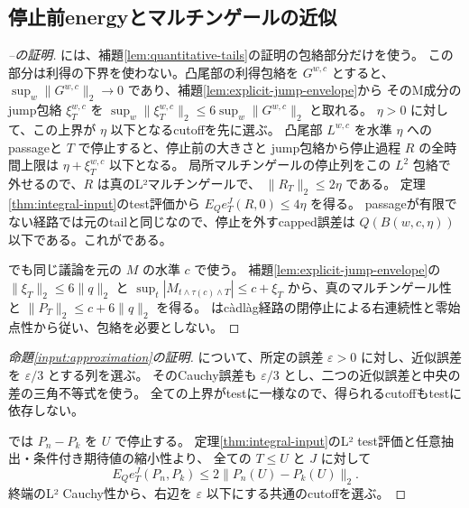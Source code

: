 \subsection{停止前energyとマルチンゲールの近似}
\label{sec:approximation-inputs}
\begin{proof}[--の証明]
には、補題\ref{lem:quantitative-tails}の証明の包絡部分だけを使う。
この部分は利得の下界を使わない。凸尾部の利得包絡を $G^{w,c}$ とすると、
$\sup_w\|G^{w,c}\|_2\to0$ であり、補題\ref{lem:explicit-jump-envelope}から
そのM成分のjump包絡 $\xi_T^{w,c}$ を $\sup_w\|\xi_T^{w,c}\|_2\leq6\sup_w\|G^{w,c}\|_2$ と取れる。
$\eta>0$ に対して、この上界が $\eta$ 以下となるcutoffを先に選ぶ。
凸尾部 $L^{w,c}$ を水準 $\eta$ へのpassageと $T$ で停止すると、停止前の大きさと
jump包絡から停止過程 $R$ の全時間上限は $\eta+\xi_T^{w,c}$ 以下となる。
局所マルチンゲールの停止列をこの $L^2$ 包絡で外せるので、$R$ は真のL²マルチンゲールで、
$\|R_T\|_2\leq2\eta$ である。
定理\ref{thm:integral-input}のtest評価から $E_Q e_T^J(R,0)\leq4\eta$ を得る。
passageが有限でない経路では元のtailと同じなので、停止を外すcapped誤差は
$Q(B(w,c,\eta))$ 以下である。これがである。

でも同じ議論を元の $M$ の水準 $c$ で使う。
補題\ref{lem:explicit-jump-envelope}の $\|\xi_T\|_2\leq6\|q\|_2$ と
$\sup_t|M_{t\wedge\tau(c)\wedge T}|\leq c+\xi_T$ から、真のマルチンゲール性と
$\|P_T\|_2\leq c+6\|q\|_2$ を得る。
はcàdlàg経路の閉停止による右連続性と零始点性から従い、包絡を必要としない。
\end{proof}

\begin{proof}[命題\ref{input:approximation}の証明]
について、所定の誤差 $\varepsilon>0$ に対し、近似誤差を $\varepsilon/3$ とする列を選ぶ。
そのCauchy誤差も $\varepsilon/3$ とし、二つの近似誤差と中央の差の三角不等式を使う。
全ての上界がtestに一様なので、得られるcutoffもtestに依存しない。

では $P_n-P_k$ を $U$ で停止する。
定理\ref{thm:integral-input}のL² test評価と任意抽出・条件付き期待値の縮小性より、
全ての $T\leq U$ と $J$ に対して
\[
 E_Qe_T^J(P_n,P_k)\leq2\|P_n(U)-P_k(U)\|_2.
\]
終端のL² Cauchy性から、右辺を $\varepsilon$ 以下にする共通のcutoffを選ぶ。
\end{proof}
